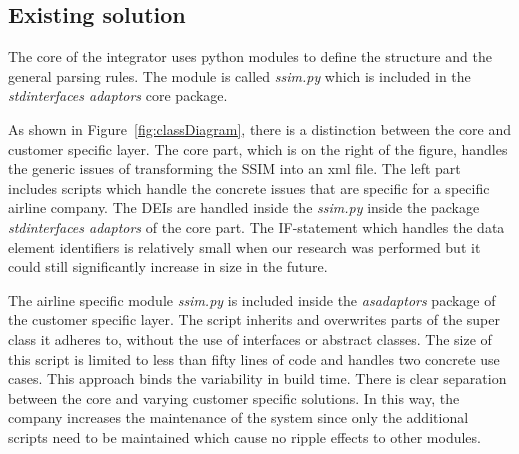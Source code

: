 %

\subsection{Existing solution} %
The core of the integrator uses python modules to define the structure and the general parsing rules. The module is called \textit{ssim.py} which is included in the \textit{std\textunderscore interfaces \textunderscore adaptors} core package.

As shown in Figure~\ref{fig:classDiagram}, there is a distinction between the core and customer specific layer. The core part, which is on the right of the figure, handles the generic issues of transforming the SSIM into an xml file. The left part includes scripts which handle the concrete issues that are specific for a specific airline company. The DEIs are handled inside the \textit{ssim.py} inside the package \textit{std\textunderscore interfaces \textunderscore adaptors} of the core part. The IF-statement which handles the data element identifiers is relatively small when our research was performed but it could still significantly increase in size in the future.

The airline specific module \textit{ssim.py} is included inside the \textit{as\textunderscore adaptors} package of the customer specific layer. The script inherits and overwrites parts of the super class it adheres to, without the use of interfaces or abstract classes. The size of this script is limited to less than fifty lines of code and handles two concrete use cases. 
This approach binds the variability in build time. There is clear separation between the core and varying customer specific solutions. In this way, the company increases the maintenance of the system since only the additional scripts need to be maintained which cause no ripple effects to other modules. 


